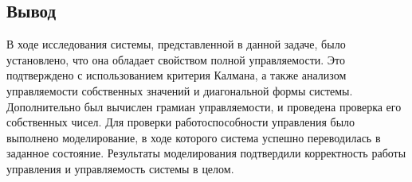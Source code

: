 \subsection{Вывод}
В ходе исследования системы, представленной в данной задаче, 
было установлено, что она обладает свойством полной управляемости. 
Это подтверждено с использованием критерия Калмана, 
а также анализом управляемости собственных значений 
и диагональной формы системы. Дополнительно был вычислен 
грамиан управляемости, и проведена проверка его собственных чисел. 
Для проверки работоспособности управления было выполнено моделирование, 
в ходе которого система успешно переводилась в заданное состояние. 
Результаты моделирования подтвердили корректность работы управления 
и управляемость системы в целом.